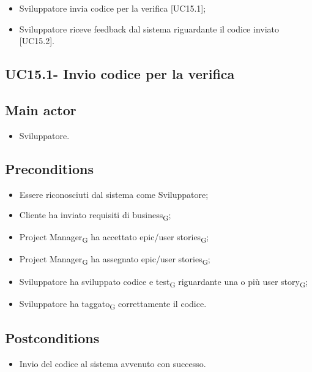 \documentclass{article}
\begin{document}
        \begin{itemize}
            \item Sviluppatore invia codice per la verifica [UC15.1];

            \item Sviluppatore riceve feedback dal sistema riguardante il codice inviato [UC15.2].
        \end{itemize}
        
    \subsection{UC15.1- Invio codice per la verifica}
    \subsection*{Main actor}
        \begin{itemize}
            \item Sviluppatore.
        \end{itemize}
        
    \subsection*{Preconditions}
        \begin{itemize}
            \item Essere riconosciuti dal sistema come Sviluppatore;
            \item Cliente ha inviato requisiti di business\textsubscript{G};
            \item Project Manager\textsubscript{G} ha accettato epic/user stories\textsubscript{G};
            \item Project Manager\textsubscript{G} ha assegnato epic/user stories\textsubscript{G};
            \item Sviluppatore ha sviluppato codice e test\textsubscript{G} riguardante una o più user story\textsubscript{G};
            \item Sviluppatore ha taggato\textsubscript{G} correttamente il codice.
        \end{itemize}

    \subsection*{Postconditions}
        \begin{itemize}
            \item Invio del codice al sistema avvenuto con successo.
        \end{itemize}
\end{document}
